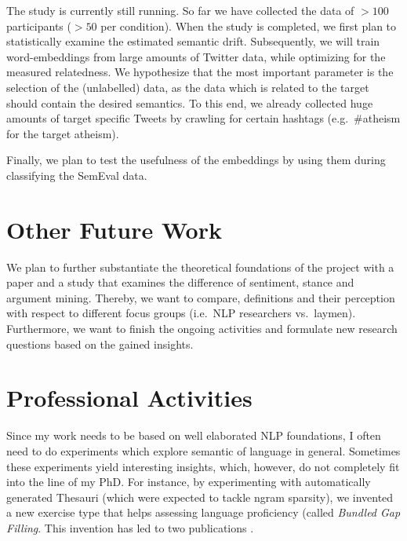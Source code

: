 \documentclass[11pt]{article}
\begin{document}
The study is currently still running.
So far we have collected the data of $> 100 $ participants ($>50$ per condition).
When the study is completed, we first plan to statistically examine the estimated semantic drift.
Subsequently, we will train word-embeddings from large amounts of Twitter data, while optimizing for the measured relatedness.
We hypothesize that the most important parameter is the selection of the (unlabelled) data, as the data which is related to the target should contain the desired semantics.
To this end, we already collected huge amounts of target specific Tweets by crawling for certain hashtags (e.g.\ \#atheism for the target atheism).

Finally, we plan to test the usefulness of the embeddings by using them during classifying the SemEval data.


\section{Other Future Work}
We plan to further substantiate the theoretical foundations of the project with a paper and a study that examines the difference of sentiment, stance and argument mining.
Thereby, we want to compare, definitions and their perception with respect to different focus groups (i.e.\ NLP researchers vs.\ laymen).
Furthermore, we want to finish the ongoing activities and formulate new research questions based on the gained insights. 


\section{Professional Activities}
Since my work needs to be based on well elaborated NLP foundations, I often need to do experiments which explore semantic of language in general.
Sometimes these experiments yield interesting insights, which, however, do not completely fit into the line of my PhD. 
For instance, by experimenting with automatically generated Thesauri (which were expected to tackle ngram sparsity), we invented a new exercise type that helps assessing language proficiency (called \textit{Bundled Gap Filling}.
This invention has led to two publications \cite{wojatzki2016bundled,meyer2016}.
 
\end{document}
